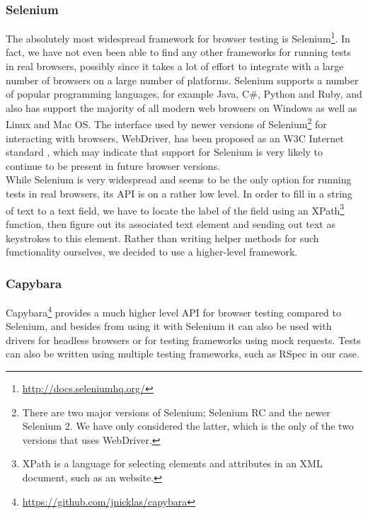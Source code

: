 \label{sec:choices_browser}

\subsubsection{Selenium}

The absolutely most widespread framework for browser testing is
Selenium\footnote{\url{http://docs.seleniumhq.org/}}. In fact, we have
not even been able to find any other frameworks for running tests in
real browsers, possibly since it takes a lot of effort to integrate with
a large number of browsers on a large number of platforms. Selenium
supports a number of popular programming languages, for example Java,
C\#, Python and Ruby, and also has support the majority of all modern
web browsers on Windows as well as Linux and Mac OS. The interface used
by newer versions of Selenium\footnote{There are two major versions of
Selenium; Selenium RC and the newer Selenium 2. We have only considered
the latter, which is the only of the two versions that uses WebDriver.}
for interacting with browsers, WebDriver, has been proposed as an W3C
Internet standard \cite{web:webdriver}, which may indicate that support
for Selenium is very likely to continue to be present in future browser
versions. \cite{wiki:selenium}\\

While Selenium is very widespread and seems to be the only option for
running tests in real browsers, its API is on a rather low level. In
order to fill in a string of text to a text field, we have to locate the
label of the field using an XPath\footnote{XPath is a language for
selecting elements and attributes in an XML document, such as an
website.} function, then figure out its associated text element and
sending out text as keystrokes to this element. Rather than writing
helper methods for such functionality ourselves, we decided to use
a higher-level framework.\\

\subsubsection{Capybara}
Capybara\footnote{\url{https://github.com/jnicklas/capybara}} provides a
much higher level API for browser testing compared to Selenium, and
besides from using it with Selenium it can also be used with drivers for
headless browsers or for testing frameworks using mock requests. Tests
can also be written using multiple testing frameworks, such as RSpec
in our case.\\

